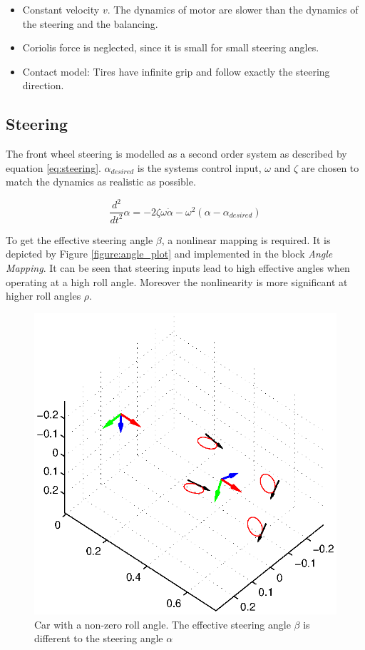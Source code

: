 \documentclass[conference]{IEEEtran}
\begin{document}
\begin{itemize}
    \item Constant velocity $v$. The dynamics of motor are slower than the dynamics of the steering and the balancing.
    \item Coriolis force is neglected, since it is small for small steering angles.
    \item Contact model: Tires have infinite grip and follow exactly the steering direction.
\end{itemize}


\subsection{Steering}

The front wheel steering is modelled as a second order system as described by equation \ref{eq:steering}. $\alpha _{desired}$ is the systems control input, $\omega$ and $\zeta$ are chosen to match the dynamics as realistic as possible.

\begin{equation}
\frac{{{d^2}}}{{d{t^2}}}\alpha  =  - 2\zeta \omega \dot \alpha  - {\omega ^2}\left( {\alpha  - {\alpha _{desired}}} \right)
\label{eq:steering}
\end{equation}

To get the effective steering angle $\beta$, a nonlinear mapping is required. It is depicted by Figure \ref{figure:angle_plot} and implemented in the block \textit{Angle Mapping}. It can be seen that steering inputs lead to high effective angles when operating at a high roll angle. Moreover the nonlinearity is more significant at higher roll angles $\rho$.

\begin{figure}[Hhh]
\centering
  \includegraphics[width=.3\textwidth]{pics/car_roll.eps} 
  \caption{Car with a non-zero roll angle. The effective steering angle $\beta$ is different to the steering angle $\alpha$}  
  \label{figure:car_roll}
\end{figure}
\end{document}
